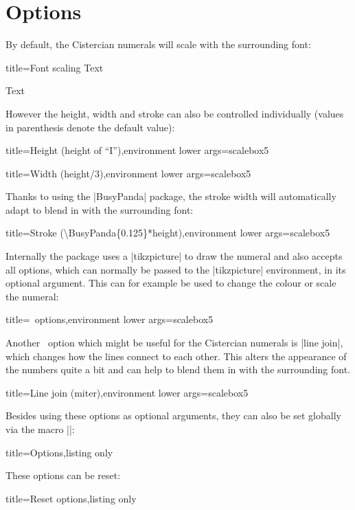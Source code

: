 \documentclass{scrartcl}
\begin{document}
\section{Options}

By default, the Cistercian numerals will scale with the surrounding font:
\begin{tcblisting}{title={Font scaling}}
 Text

\Huge {} Text
\end{tcblisting}

However the height, width and stroke can also be controlled individually (values in parenthesis denote the default value):
\begin{tcblisting}{title={Height (height of ``I'')},environment lower args={scalebox}{5}}
\end{tcblisting}
\begin{tcblisting}{title={Width (height/3)},environment lower args={scalebox}{5}}
\end{tcblisting}
Thanks to using the \saminline|BusyPanda| package, the stroke width will automatically adapt to blend in with the surrounding font:
\begin{tcblisting}{title={Stroke (\textbackslash BusyPanda\{0.125\}*height)},environment lower args={scalebox}{5}}
\end{tcblisting}

Internally the package uses a \saminline|tikzpicture| to draw the numeral and also accepts all options, which can normally be passed to the \saminline|tikzpicture| environment, in its optional argument. This can for example be used to change the colour or scale the numeral:
\begin{tcblisting}{title={\TikZ\ options},environment lower args={scalebox}{5}}
\end{tcblisting}

Another \TikZ\ option which might be useful for the Cistercian numerals is \saminline|line join|, which changes how the lines connect to each other. This alters the appearance of the numbers quite a bit and can help to blend them in with the surrounding font.
\begin{tcblisting}{title={Line join (miter)},environment lower args={scalebox}{5}}
\end{tcblisting}

Besides using these options as optional arguments, they can also be set globally via the macro \saminline|\cistercianset|:
\begin{tcblisting}{title={Options},listing only}
\end{tcblisting}

These options can be reset:
\begin{tcblisting}{title={Reset options},listing only}
\cistercianreset
\end{tcblisting}
\end{document}
